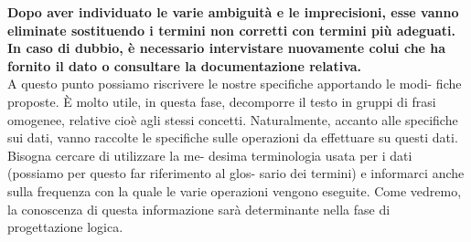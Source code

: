 \documentclass[a4paper,12pt, oneside]{book}
\begin{document}
\textbf{Dopo aver individuato le varie ambiguità e le imprecisioni, esse vanno eliminate
sostituendo i termini non corretti con termini più adeguati. In caso di dubbio, è
necessario intervistare nuovamente colui che ha fornito il dato o consultare la
documentazione relativa.}\\
A questo punto possiamo riscrivere le nostre specifiche apportando le modi-
fiche proposte. È molto utile, in questa fase, decomporre il testo in gruppi di frasi
omogenee, relative cioè agli stessi concetti. Naturalmente, accanto alle specifiche sui dati, vanno raccolte le specifiche
sulle operazioni da effettuare su questi dati. Bisogna cercare di utilizzare la me-
desima terminologia usata per i dati (possiamo per questo far riferimento al glos-
sario dei termini) e informarci anche sulla frequenza con la quale le varie operazioni vengono eseguite. Come vedremo, la conoscenza di questa informazione
sarà determinante nella fase di progettazione logica.
\end{document}
